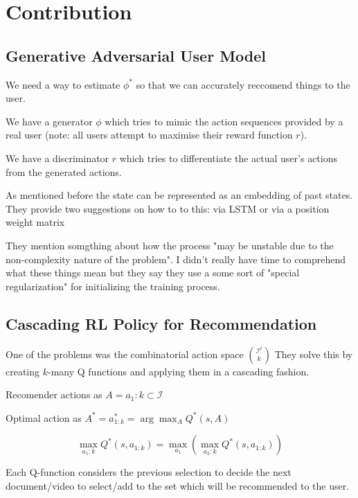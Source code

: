 \documentclass{article}
\begin{document}
    \section{Contribution}

    \subsection{Generative Adversarial User Model}
    We need a way to estimate $\phi ^*$ so that we can accurately reccomend things to the user.

    We have a generator $\phi$ which tries to mimic the action sequences provided by a real user (note: all users attempt to maximise their reward function $r$).

    We have a discriminator $r$ which tries to differentiate the actual user's actions from the generated actions.

    As mentioned before the state can be represented as an embedding of past states. They provide two suggestions on how to to this: via LSTM or via a position weight matrix

    They mention somgthing about how the process "may be unstable due to the non-complexity nature of the problem". I didn't really have time to comprehend what these things mean but they say they use a some sort of "special regularization" for initializing the training process.

    \subsection{Cascading RL Policy for Recommendation}

    One of the problems was the combinatorial action space ${\mathcal{I}^t \choose k}$
    They solve this by creating $k$-many Q functions and applying them in a cascading fashion.
    
    Recomender actions as $A = {a_1 : k} \subset \mathcal{I}$

    Optimal action as $A^* = {a_{1: k}^*} = \arg \max _A Q^* (s, A)$

    $$\max_{a_1 : k} Q^* (s, a_{1 : k}) = \max_{a_1} (\max_{a_2 : k} Q^* (s, a_{1 : k}))$$

    Each Q-function considers the previous selection to decide the next document/video to select/add to the set which will be recommended to the user.

    
    
\end{document}
